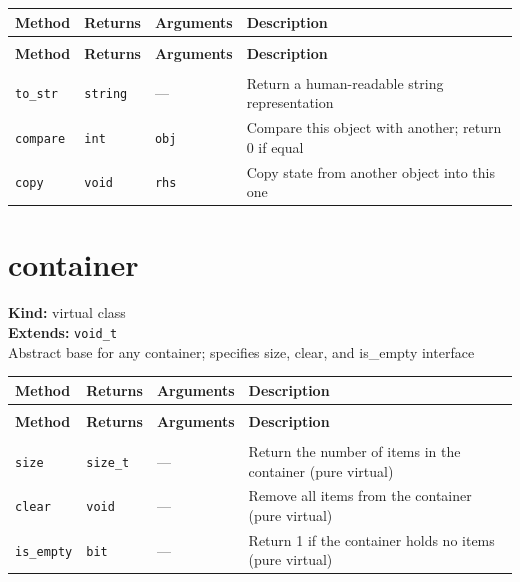\documentclass[11pt,letterpaper]{report}
\begin{document}
\begin{xltabular}{\linewidth}{>{\small}p{1.35in} >{\small}p{1.25in} >{\small}p{0.95in} >{\small}X}
\toprule
\textbf{Method} & \textbf{Returns} & \textbf{Arguments} & \textbf{Description} \\
\midrule
\endfirsthead
{} \\
\midrule
\textbf{Method} & \textbf{Returns} & \textbf{Arguments} & \textbf{Description} \\
\midrule
\endhead
\midrule
{} \\
\endfoot
\bottomrule
\endlastfoot
\texttt{to\_str} & \texttt{string} & --- & Return a human-readable string representation \\
\texttt{compare} & \texttt{int} & \texttt{obj} & Compare this object with another; return 0 if equal \\
\texttt{copy} & \texttt{void} & \texttt{rhs} & Copy state from another object into this one \\
\end{xltabular}

\section{container}
\label{cls:container}

\noindent\textbf{Kind:} virtual class\\
\noindent\textbf{Extends:} \texttt{void\_t}\\
\noindent Abstract base for any container; specifies size, clear, and is\_empty interface

\begin{xltabular}{\linewidth}{>{\small}p{1.35in} >{\small}p{1.25in} >{\small}p{0.95in} >{\small}X}
\toprule
\textbf{Method} & \textbf{Returns} & \textbf{Arguments} & \textbf{Description} \\
\midrule
\endfirsthead
{} \\
\midrule
\textbf{Method} & \textbf{Returns} & \textbf{Arguments} & \textbf{Description} \\
\midrule
\endhead
\midrule
{} \\
\endfoot
\bottomrule
\endlastfoot
\texttt{size} & \texttt{size\_t} & --- & Return the number of items in the container (pure virtual) \\
\texttt{clear} & \texttt{void} & --- & Remove all items from the container (pure virtual) \\
\texttt{is\_empty} & \texttt{bit} & --- & Return 1 if the container holds no items (pure virtual) \\
\end{xltabular}
\end{document}
